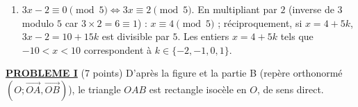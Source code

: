 \begin{description}
\begin{enumerate}
\begin{enumerate}
			\item {}
				Notons $A_n = 9^{n+1} + 2^{6n+1}$. $A_0 = 9 + 2 = 11$ est divisible par $11$.
				Si $A_n = 11k$, alors
				$A_{n+1} = 9 \times 9^{n+1} + 64 \times 2^{6n+1} = 9A_n + 55 \times 2^{6n+1} = 11\left(9k + 5 \times 2^{6n+1}\right)$.
				\par\noindent{}
		\end{enumerate}
		\item {}
			$3x - 2 \equiv 0 \pmod 5 \iff 3x \equiv 2 \pmod 5$. En multipliant par $2$ (inverse de $3$ modulo $5$ car $3 \times 2 = 6 \equiv 1$) :
			$x \equiv 4 \pmod 5$ ; réciproquement, si $x = 4 + 5k$, $3x - 2 = 10 + 15k$ est divisible par $5$.
			Les entiers $x = 4 + 5k$ tels que $-10 < x < 10$ correspondent à $k \in \{-2, -1, 0, 1\}$.
			\par\noindent{}
	\end{enumerate}
\end{description}
\noindent \underline{\textsc{\textbf{PROBLEME I}}} (7 points) \newline
D'après la figure et la partie B (repère orthonormé $(O;\overrightarrow{OA},\overrightarrow{OB})$), le triangle $OAB$ est rectangle isocèle en $O$, de sens direct.
